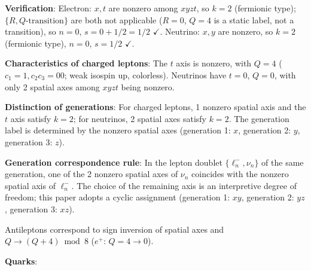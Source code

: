 \documentclass[
  a4paper,11pt]{article}
\theoremstyle{definition}
\theoremstyle{remark}
\begin{document}
\textbf{Verification}: Electron: \(x, t\) are nonzero among \(xyzt\), so
\(k = 2\) (fermionic type); \(\{R, Q\text{-transition}\}\) are both not
applicable (\(R = 0\), \(Q = 4\) is a static label, not a transition),
so \(n = 0\), \(s = 0 + 1/2 = 1/2\) \(\checkmark\). Neutrino: \(x, y\)
are nonzero, so \(k = 2\) (fermionic type), \(n = 0\), \(s = 1/2\)
\(\checkmark\).

\textbf{Characteristics of charged leptons}: The \(t\) axis is nonzero,
with \(Q = 4\) (\(c_1 = 1, c_2 c_3 = 00\); weak isospin up, colorless).
Neutrinos have \(t = 0\), \(Q = 0\), with only 2 spatial axes among
\(xyzt\) being nonzero.

\textbf{Distinction of generations}: For charged leptons, 1 nonzero
spatial axis and the \(t\) axis satisfy \(k = 2\); for neutrinos, 2
spatial axes satisfy \(k = 2\). The generation label is determined by
the nonzero spatial axes (generation 1: \(x\), generation 2: \(y\),
generation 3: \(z\)).

\textbf{Generation correspondence rule}: In the lepton doublet
\(\{\ell^-_n, \nu_n\}\) of the same generation, one of the 2 nonzero
spatial axes of \(\nu_n\) coincides with the nonzero spatial axis of
\(\ell^-_n\). The choice of the remaining axis is an interpretive degree
of freedom; this paper adopts a cyclic assignment (generation 1: \(xy\),
generation 2: \(yz\), generation 3: \(xz\)).

Antileptons correspond to sign inversion of spatial axes and
\(Q \to (Q + 4) \bmod 8\) (\(e^+\): \(Q = 4 \to 0\)).

\textbf{Quarks}:
\end{document}
